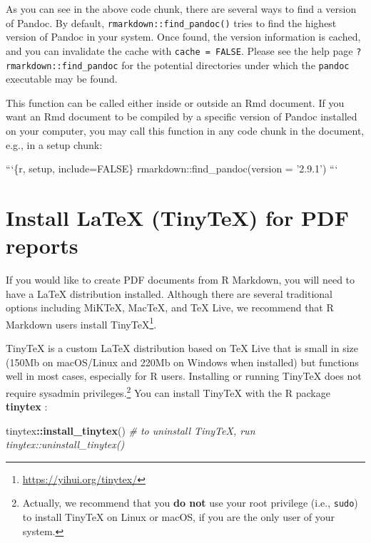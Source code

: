 \documentclass[
  11pt,
]{krantz}
\newenvironment{Shaded}{\begin{snugshade}}{\end{snugshade}}
\newcommand{\BaseNTok}[1]{\textcolor[rgb]{0.06,0.06,0.06}{#1}}
\newcommand{\CommentTok}[1]{\textcolor[rgb]{0.37,0.37,0.37}{\textit{#1}}}
\newcommand{\KeywordTok}[1]{\textcolor[rgb]{0.27,0.27,0.27}{\textbf{#1}}}
\newcommand{\NormalTok}[1]{#1}
\newcommand{\OperatorTok}[1]{\textcolor[rgb]{0.43,0.43,0.43}{\textbf{#1}}}
\renewcommand{\href}[2]{#2\footnote{\url{#1}}}
\begin{document}
As you can see in the above code chunk, there are several ways to find a version of Pandoc. By default, \texttt{rmarkdown::find\_pandoc()} tries to find the highest version of Pandoc in your system. Once found, the version information is cached, and you can invalidate the cache with \texttt{cache\ =\ FALSE}. Please see the help page \texttt{?rmarkdown::find\_pandoc} for the potential directories under which the \texttt{pandoc} executable may be found.

This function can be called either inside or outside an Rmd document. If you want an Rmd document to be compiled by a specific version of Pandoc installed on your computer, you may call this function in any code chunk in the document, e.g., in a setup chunk:

\begin{Shaded}
\begin{Highlighting}[]
\BaseNTok{```\{r, setup, include=FALSE\}}
\BaseNTok{rmarkdown::find_pandoc(version = '2.9.1')}
\BaseNTok{```}
\end{Highlighting}
\end{Shaded}

\hypertarget{install-latex}{%
\section{Install LaTeX (TinyTeX) for PDF reports}\label{install-latex}}

If you would like to create PDF documents from R Markdown, you will need to have a LaTeX distribution installed. Although there are several traditional options including MiKTeX, MacTeX, and TeX Live, we recommend that R Markdown users install \href{https://yihui.org/tinytex/}{TinyTeX}.

TinyTeX is a custom LaTeX distribution based on TeX Live that is small in size (150Mb on macOS/Linux and 220Mb on Windows when installed) but functions well in most cases, especially for R users. Installing or running TinyTeX does not require sysadmin privileges.\footnote{Actually, we recommend that you \textbf{do not} use your root privilege (i.e., \texttt{sudo}) to install TinyTeX on Linux or macOS, if you are the only user of your system.} You can install TinyTeX with the R package \textbf{tinytex} \citep{R-tinytex}:

\begin{Shaded}
\begin{Highlighting}[]
\NormalTok{tinytex}\OperatorTok{::}\KeywordTok{install_tinytex}\NormalTok{()}
\CommentTok{# to uninstall TinyTeX, run tinytex::uninstall_tinytex()}
\end{Highlighting}
\end{Shaded}
\end{document}
